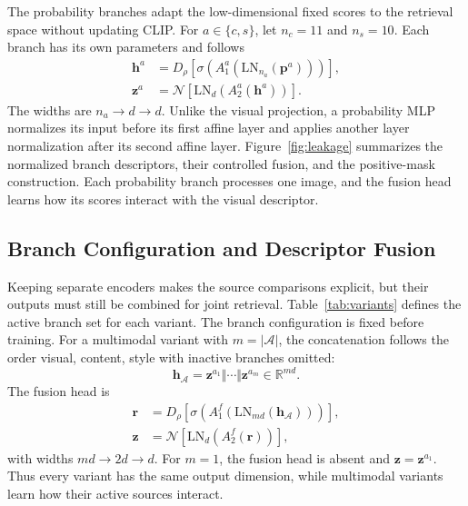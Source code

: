 \documentclass[journal]{IEEEtran}
\newcommand{\vect}[1]{\boldsymbol{#1}}
\begin{document}
The probability branches adapt the low-dimensional fixed scores to the
retrieval space without updating CLIP. For $a\in\{c,s\}$, let $n_c=11$ and
$n_s=10$. Each branch has its own parameters and follows
\begin{align}
  \vect{h}^{a}&=D_\rho\!\left[
    \sigma\!\left(A_1^a(\mathrm{LN}_{n_a}(\vect{p}^{a}))\right)\right],\\
  \vect{z}^{a}&=\mathcal{N}\!\left[
    \mathrm{LN}_{d}(A_2^a(\vect{h}^{a}))\right].
  \label{eq:probability-encoder}
\end{align}
The widths are $n_a\rightarrow d\rightarrow d$. Unlike the visual
projection, a probability MLP normalizes its input before its first affine
layer and applies another layer normalization after its second affine layer.
Figure~\ref{fig:leakage} summarizes the normalized branch descriptors, their controlled fusion, and the positive-mask construction. Each probability branch processes one image, and the fusion head learns
how its scores interact with the visual descriptor.

\subsection{Branch Configuration and Descriptor Fusion}

Keeping separate encoders makes the source comparisons explicit, but their
outputs must still be combined for joint retrieval. Table~\ref{tab:variants}
defines the active branch set for each variant. The branch configuration is
fixed before training. For a multimodal
variant with $m=|\mathcal{A}|$, the concatenation follows the order visual,
content, style with inactive branches omitted:
\begin{equation}
  \vect{h}_{\mathcal{A}}=
  \vect{z}^{a_1}\Vert\cdots\Vert\vect{z}^{a_m}\in\mathbb{R}^{md}.
  \label{eq:active-concatenation}
\end{equation}
The fusion head is
\begin{align}
  \vect{r}&=D_\rho\!\left[
    \sigma\!\left(A_1^f(\mathrm{LN}_{md}(\vect{h}_{\mathcal{A}}))\right)\right],\\
  \vect{z}&=\mathcal{N}\!\left[\mathrm{LN}_{d}(A_2^f(\vect{r}))\right],
  \label{eq:fusion-head}
\end{align}
with widths $md\rightarrow2d\rightarrow d$. For $m=1$, the fusion head is
absent and $\vect{z}=\vect{z}^{a_1}$. Thus every variant has the same output
dimension, while multimodal variants learn how their active sources interact.
\end{document}
